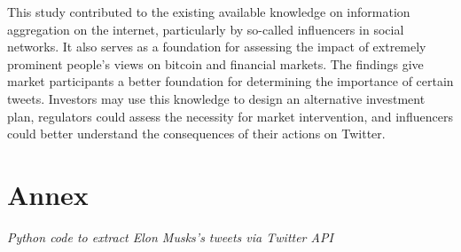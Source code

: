 \documentclass[
]{article}
\begin{document}
This study contributed to the existing available knowledge on
information aggregation on the internet, particularly by so-called
influencers in social networks. It also serves as a foundation for
assessing the impact of extremely prominent people's views on bitcoin
and financial markets. The findings give market participants a better
foundation for determining the importance of certain tweets. Investors
may use this knowledge to design an alternative investment plan,
regulators could assess the necessity for market intervention, and
influencers could better understand the consequences of their actions on
Twitter.

\hypertarget{annex}{%
\section{Annex}\label{annex}}

\emph{Python code to extract Elon Musks's tweets via Twitter API}
\end{document}
